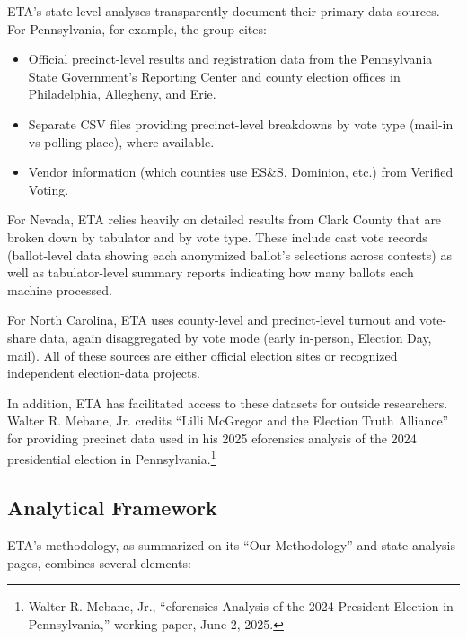 \documentclass[12pt]{article}
\begin{document}
ETA's state-level analyses transparently document their primary data sources. For Pennsylvania, for example, the group cites:

\begin{itemize}
    \item Official precinct-level results and registration data from the Pennsylvania State Government's Reporting Center and county election offices in Philadelphia, Allegheny, and Erie.
    \item Separate CSV files providing precinct-level breakdowns by vote type (mail-in vs polling-place), where available.
    \item Vendor information (which counties use ES\&S, Dominion, etc.) from Verified Voting.
\end{itemize}

For Nevada, ETA relies heavily on detailed results from Clark County that are broken down by tabulator and by vote type. These include cast vote records (ballot-level data showing each anonymized ballot's selections across contests) as well as tabulator-level summary reports indicating how many ballots each machine processed.

For North Carolina, ETA uses county-level and precinct-level turnout and vote-share data, again disaggregated by vote mode (early in-person, Election Day, mail). All of these sources are either official election sites or recognized independent election-data projects.

In addition, ETA has facilitated access to these datasets for outside researchers. Walter R. Mebane, Jr. credits \enquote{Lilli McGregor and the Election Truth Alliance} for providing precinct data used in his 2025 eforensics analysis of the 2024 presidential election in Pennsylvania.\footnote{Walter R. Mebane, Jr., ``eforensics Analysis of the 2024 President Election in Pennsylvania,'' working paper, June 2, 2025.}

\subsection{Analytical Framework}

ETA's methodology, as summarized on its ``Our Methodology'' and state analysis pages, combines several elements:
\end{document}
